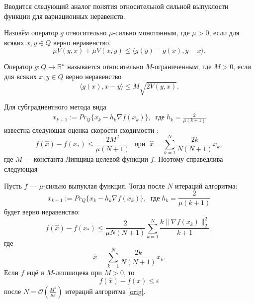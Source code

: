 Вводится следующий аналог понятия относительной сильной выпуклости функции \cite{Lu_Nesterov_2018} для вариационных неравенств.
\begin{definition}\label{DefRelStrongMonot}
    Назовём оператор $g$ относительно $\mu$-сильно монотонным, где $\mu >0$, если для всяких $x, y \in Q$ верно неравенство
        \begin{equation}\label{eq:3}
             \mu V(y, x) + \mu V(x, y) \leq \langle g(y) - g(x), y - x \rangle.
         \end{equation}
\end{definition}
\begin{definition}\label{DefRelBound}\cite{Main}
    Оператор $g: Q \longrightarrow \mathbb{R}^n$ называется относительно $M$-ограниченным, где $M >0$, если для всяких $x, y \in Q$ верно неравенство
    \begin{equation}\label{rel_bound}
         \langle g(x), x - y \rangle \leq M\sqrt{2V(y,x)}.
     \end{equation}
\end{definition}
\iffalse
    Для субградиентного метода вида
    \begin{gather}\label{orig}
        x_{k+1} := Pr_{Q}\{x_k - h_k \nabla f(x_k) \}, \;\; \textit{где} \; h_k = \frac{2}{\mu (k+1)}
    \end{gather}
    известна следующая оценка скорости сходимости \cite{Bach_2012}:
    \begin{equation}\label{orig_estimation_f}
        f(\widehat{x}) - f(x_*) \leq \frac{2 M^2}{\mu (N+1)}  \; \text{  при   } \; \widehat{x} = \sum\limits_{k=1}^{N} \frac{2 k}{N (N+1)} x_k, 
    \end{equation}
    где $M$ --- константа Липщица целевой функции $f$.
    Поэтому справедлива следующая
    \begin{theorem}\label{ThmBachAdaptive}
        Пусть $f$ --- $\mu$-сильно выпуклая функция. Тогда после $N$ итераций алгоритма:
        $$
            x_{k+1} := Pr_{Q}\{x_k - h_k \nabla f(x_k) \}, \;\; \textit{где} \; h_k = \frac{2}{\mu (k+1)}
        $$
        будет верно неравенство:
        \begin{equation}\label{adaptive_estimation_f}
            f(\widehat{x}) - f(x_*) \leq \frac{2}{\mu N (N+1)} \sum_{k=1}^{N} \frac{k \|\nabla f(x_k)\|_2^2}{k+1},
        \end{equation}
        где
        $$
            \widehat{x} = \sum_{k=1}^{N} \frac{2 k}{N (N+1)} x_k.
        $$
        Если $f$ ещё и $M$-липшицева при $M >0$, то
        $$
             f(\widehat{x}) - f(x) \leq \varepsilon
        $$
        после $N = \mathcal{O}(\frac{M^2}{\mu\varepsilon})$ итераций алгоритма \eqref{orig}.
    \end{theorem}

